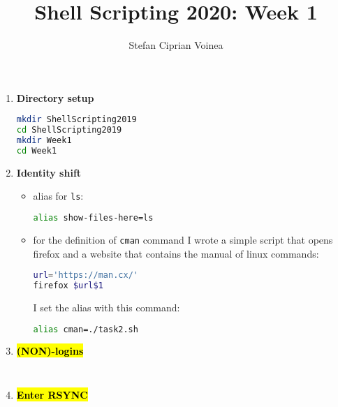 \documentclass[9pt]{article}
\begin{document}
\title{Shell Scripting 2020: Week 1}
\author{Stefan Ciprian Voinea}
\maketitle


\begin{enumerate}
	\item \textbf{Directory setup}
		\begin{lstlisting}[language=bash]
mkdir ShellScripting2019
cd ShellScripting2019
mkdir Week1
cd Week1
		\end{lstlisting}

	\item \textbf{Identity shift}
		\begin{itemize}
			\item alias for \texttt{ls}:
			\begin{lstlisting}[language=bash]
alias show-files-here=ls
			\end{lstlisting}
			\item for the definition of \texttt{cman} command I wrote a simple script that opens firefox and a website that contains the manual of linux commands:
			\begin{lstlisting}[language=bash]
url='https://man.cx/'
firefox $url$1 
			\end{lstlisting}
			I set the alias with this command:
			\begin{lstlisting}[language=bash]
alias cman=./task2.sh
			\end{lstlisting}
		\end{itemize}


	\item \hl{\textbf{(NON)-logins}}
		\begin{lstlisting}[language=bash]
		
		\end{lstlisting}

	\item \hl{\textbf{Enter RSYNC}}
		\begin{lstlisting}[language=bash]
		\end{lstlisting}


\end{enumerate}
\end{document}
